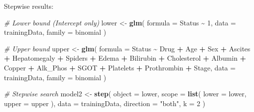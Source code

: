 \documentclass[
]{article}
\newenvironment{Shaded}{\begin{snugshade}}{\end{snugshade}}
\newcommand{\AttributeTok}[1]{\textcolor[rgb]{0.13,0.29,0.53}{#1}}
\newcommand{\CommentTok}[1]{\textcolor[rgb]{0.56,0.35,0.01}{\textit{#1}}}
\newcommand{\DecValTok}[1]{\textcolor[rgb]{0.00,0.00,0.81}{#1}}
\newcommand{\FunctionTok}[1]{\textcolor[rgb]{0.13,0.29,0.53}{\textbf{#1}}}
\newcommand{\NormalTok}[1]{#1}
\newcommand{\OtherTok}[1]{\textcolor[rgb]{0.56,0.35,0.01}{#1}}
\newcommand{\SpecialCharTok}[1]{\textcolor[rgb]{0.81,0.36,0.00}{\textbf{#1}}}
\newcommand{\StringTok}[1]{\textcolor[rgb]{0.31,0.60,0.02}{#1}}
\begin{document}
Stepwise results:

\begin{Shaded}
\begin{Highlighting}[]
\CommentTok{\# Lower bound (Intercept only)}
\NormalTok{lower }\OtherTok{\textless{}{-}} \FunctionTok{glm}\NormalTok{(}
  \AttributeTok{formula =}\NormalTok{ Status }\SpecialCharTok{\textasciitilde{}} \DecValTok{1}\NormalTok{,}
  \AttributeTok{data =}\NormalTok{ trainingData,}
  \AttributeTok{family =}\NormalTok{ binomial}
\NormalTok{)}

\CommentTok{\# Upper bound }
\NormalTok{upper }\OtherTok{\textless{}{-}} \FunctionTok{glm}\NormalTok{(}
  \AttributeTok{formula =}\NormalTok{ Status }\SpecialCharTok{\textasciitilde{}}\NormalTok{ Drug }\SpecialCharTok{+}\NormalTok{ Age }\SpecialCharTok{+}\NormalTok{ Sex }\SpecialCharTok{+}\NormalTok{ Ascites }\SpecialCharTok{+}\NormalTok{ Hepatomegaly }\SpecialCharTok{+}\NormalTok{ Spiders }\SpecialCharTok{+}\NormalTok{ Edema }\SpecialCharTok{+}\NormalTok{ Bilirubin }\SpecialCharTok{+}\NormalTok{ Cholesterol }\SpecialCharTok{+}\NormalTok{ Albumin }\SpecialCharTok{+}\NormalTok{ Copper }\SpecialCharTok{+}\NormalTok{ Alk\_Phos }\SpecialCharTok{+}\NormalTok{ SGOT }\SpecialCharTok{+}\NormalTok{ Platelets }\SpecialCharTok{+}\NormalTok{ Prothrombin }\SpecialCharTok{+}\NormalTok{ Stage,}
  \AttributeTok{data =}\NormalTok{ trainingData,}
  \AttributeTok{family =}\NormalTok{ binomial}
\NormalTok{)}


\CommentTok{\# Stepwise search}
\NormalTok{model2 }\OtherTok{\textless{}{-}} \FunctionTok{step}\NormalTok{(}
  \AttributeTok{object =}\NormalTok{ lower,}
  \AttributeTok{scope =} \FunctionTok{list}\NormalTok{(}
    \AttributeTok{lower =}\NormalTok{ lower,}
    \AttributeTok{upper =}\NormalTok{ upper}
\NormalTok{  ),}
  \AttributeTok{data =}\NormalTok{ trainingData,}
  \AttributeTok{direction =} \StringTok{"both"}\NormalTok{,}
  \AttributeTok{k =} \DecValTok{2}
\NormalTok{)}
\end{Highlighting}
\end{Shaded}
\end{document}
